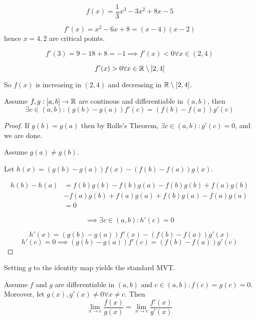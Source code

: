 \documentclass[a4paper,10pt]{article}
\begin{document}
\begin{ex}
	\[ f(x) = \frac{1}{3}x^3 - 3x^2 + 8x - 5 \]

	\[ f'(x) = x^2 - 6x + 8 = (x-4)(x-2) \]
	hence $x=4,2$ are critical points.

	\[ f'(3) = 9 - 18 + 8 = -1 \implies f'(x) < 0 \forall x \in (2,4) \]

	\[ f'(x) > 0 \forall x \in \mathbb{R} \setminus [2,4] \]

	So $f(x)$ is increasing in $(2,4)$ and decreasing in $\mathbb{R} \setminus [2,4]$.
\end{ex}

\begin{thm}
	Assume $f,g:[a,b] \to \mathbb{R}$ are continous and differentiable in $(a,b)$, then
	\[ \exists c \in (a,b) : (g(b) - g(a))f'(c) = (f(b) - f(a))g'(c) \]
\end{thm}

\begin{proof}
	If $g(b) = g(a)$ then by Rolle's Theorem, $\exists c \in (a,b) : g'(c) = 0$, and we are done.

	Assume $g(a) \neq g(b)$.

	Let $h(x) = (g(b) - g(a))f(x) - (f(b) - f(a))g(x)$.

	\begin{align*}
		h(b) - h(a) &= f(b)g(b) - f(b)g(a) - f(b)g(b) + f(a)g(b) \\
		&- f(a)g(b) + f(a)g(a) + f(b)g(a) - f(a)g(a) \\
		&= 0
	\end{align*}

	\[ \implies \exists c \in (a,b) : h'(c) = 0 \]

	\[ h'(x) = (g(b) - g(a))f'(x) - (f(b) - f(a))g'(x) \]
	\[ h'(c) = 0 \implies (g(b) - g(a))f'(c) = (f(b) - f(a))g'(c) \]
\end{proof}

\begin{rem}
	Setting $g$ to the identity map yields the standard MVT\@.
\end{rem}

\begin{lem}
	Assume $f$ and $g$ are differentiable in $(a,b)$ and $c \in (a,b) : f(c) = g(c) = 0$.
	Moreover, let $g(x), g'(x) \neq 0 \forall x \neq c$. Then
	\[ \lim_{x \to c} \frac{f(x)}{g(x)} = \lim_{x \to c} \frac{f'(x)}{g'(x)} \]
\end{lem}
\end{document}
